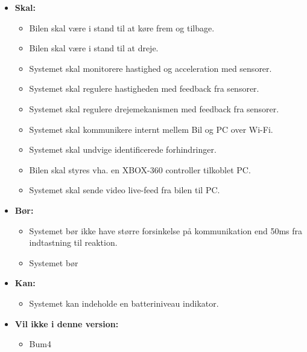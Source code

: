 \begin{itemize}
	\item \textbf{Skal:}
		\begin{itemize}
			\item Bilen skal være i stand til at køre frem og tilbage.
			\item Bilen skal være i stand til at dreje.
			\item Systemet skal monitorere hastighed og acceleration med sensorer.
			\item Systemet skal regulere hastigheden med feedback fra sensorer.
			\item Systemet skal regulere drejemekanismen med feedback fra sensorer.
			\item Systemet skal kommunikere internt mellem Bil og PC over Wi-Fi.
			\item Systemet skal undvige identificerede forhindringer. 
			\item Bilen skal styres vha. en XBOX-360 controller tilkoblet PC.
			\item Systemet skal sende video live-feed fra bilen til PC.
		\end{itemize}
	\item \textbf{Bør:}
		\begin{itemize}
			\item Systemet bør ikke have større forsinkelse på kommunikation end 50ms fra indtastning til reaktion.
			\item Systemet bør 
		\end{itemize}
	\item \textbf{Kan:}
		\begin{itemize}
			\item Systemet kan indeholde en batteriniveau indikator. %
		\end{itemize}
	\item \textbf{Vil ikke i denne version:}	
		\begin{itemize}
			\item Bum4 %
		\end{itemize}
\end{itemize}
